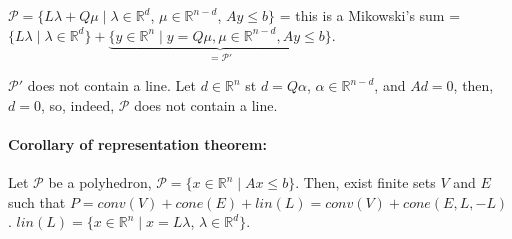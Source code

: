 \documentclass[main]{subfiles}
\begin{document}
$\mathcal{P} = \{L \lambda + Q \mu \mid \lambda \in \mathbb{R}^d$, $\mu \in
\mathbb{R}^{n-d}$, $Ay \leq b\}$ = this is a Mikowski's sum = $\{L \lambda \mid
\lambda \in \mathbb{R}^d \} + \underbrace{ \{ y \in \mathbb{R}^n \mid y = Q\mu, 
\mu \in \mathbb{R}^{n-d}, Ay \leq b \} }_{= \mathcal{P}'}$.

$\mathcal{P}'$ does not contain a line. Let $d \in \mathbb{R}^n$ st $d= Q
\alpha$, $\alpha \in \mathbb{R}^{n-d}$, and $Ad =0$, then, $d=0$, so, indeed,
$\mathcal{P}$ does not contain a line.

\paragraph{Corollary of representation theorem:} Let $\mathcal{P}$ be a
polyhedron, $\mathcal{P} = \{x\in \mathbb{R}^n \mid Ax \leq b \}$. Then, exist
finite sets $V$ and $E$ such that $P = conv(V) + cone(E) + lin(L) = conv(V) +
cone(E, L, -L)$. $lin(L) = \{x \in \mathbb{R}^n \mid x = L \lambda$, $\lambda
\in \mathbb{R}^d \}$.
\end{document}
